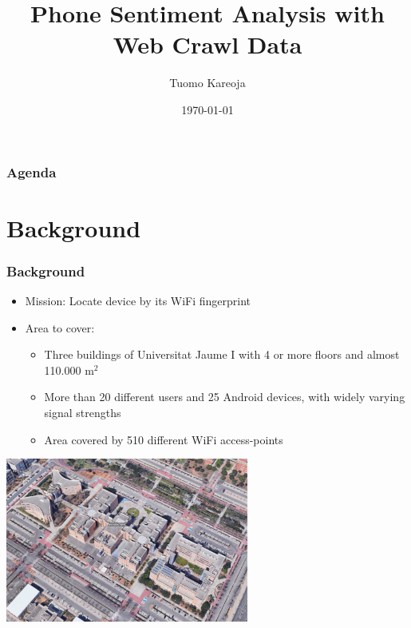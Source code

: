 \documentclass[10pt]{beamer}
\title[What Phone do People Like?]{Phone Sentiment Analysis with Web Crawl Data} %
\author{Tuomo Kareoja} %
\institute[IOT Analytics] %
{
IOT Analytics \\ %
\medskip
}
\date{\today} %
\begin{document}
\begin{frame}
\titlepage %
\end{frame}

\begin{frame}
\frametitle{Agenda} %
\tableofcontents %
\end{frame}


\section{Background}

\begin{frame}
\frametitle{
    Background
}

\begin{itemize}
    \item Mission: Locate device by its WiFi fingerprint
    \item Area to cover:
    \begin{itemize}
        \item Three buildings of Universitat Jaume I with 4 or more floors and almost 110.000 m\(^2\)
        \item More than 20 different users and 25 Android devices, with widely varying signal strengths
        \item Area covered by 510 different WiFi access-points
    \end{itemize}
\end{itemize}


{
    \centering
    \includegraphics[width=8cm,keepaspectratio]{university_campus_gmaps.png}
    \par
}

\end{frame}
\end{document}
